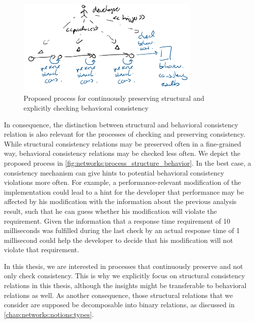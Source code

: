 \begin{figure}
    \centering
    \includegraphics[width=0.8\textwidth]{figures/prologue/process_structure_behavior.png}
    \caption[Process for preserving structural and behavioral consistency]{Proposed process for continuously preserving structural and explicitly checking behavioral consistency}
    \label{fig:networks:process_structure_behavior}
\end{figure}

In consequence, the distinction between structural and behavioral consistency relation is also relevant for the processes of checking and preserving consistency.
While structural consistency relations may be preserved often in a fine-grained way, behavioral consistency relations may be checked less often.
We depict the proposed process in \autoref{fig:networks:process_structure_behavior}.
In the best case, a consistency mechanism can give hints to potential behavioral consistency violations more often.
For example, a performance-relevant modification of the implementation could lead to a hint for the developer that performance may be affected by his modification with the information about the previous analysis result, such that he can guess whether his modification will violate the requirement.
Given the information that a response time requirement of 10 milliseconds was fulfilled during the last check by an actual response time of 1 millisecond could help the developer to decide that his modification will not violate that requirement.

In this thesis, we are interested in processes that continuously preserve and not only check consistency.
This is why we explicitly focus on structural consistency relations in this thesis, although the insights might be transferable to behavioral relations as well.
As another consequence, those structural relations that we consider are supposed be decomposable into binary relations, as discussed in \autoref{chap:networks:notions:types}.



